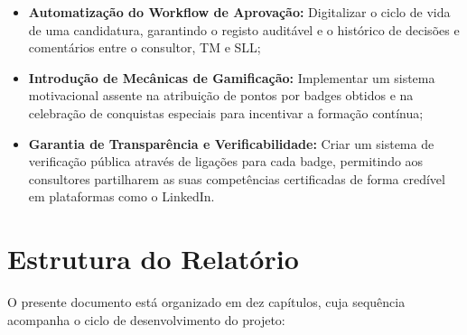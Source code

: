\documentclass[12pt,a4paper]{report}
\begin{document}
\begin{itemize}
  \item \textbf{Automatização do Workflow de Aprovação:} Digitalizar o ciclo de vida de uma candidatura, garantindo o registo auditável e o histórico de decisões e comentários entre o consultor, TM e SLL;
  \item \textbf{Introdução de Mecânicas de Gamificação:} Implementar um sistema motivacional assente na atribuição de pontos por badges obtidos e na celebração de conquistas especiais para incentivar a formação contínua;
  \item \textbf{Garantia de Transparência e Verificabilidade:} Criar um sistema de verificação pública através de ligações para cada badge, permitindo aos consultores partilharem as suas competências certificadas de forma credível em plataformas como o LinkedIn.
\end{itemize}

\section{Estrutura do Relatório}

O presente documento está organizado em dez capítulos, cuja sequência acompanha o ciclo de desenvolvimento do projeto:
\end{document}

